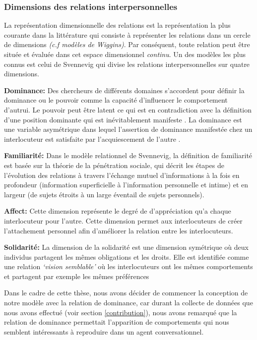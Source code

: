\documentclass[a4paper,french]{article}
\begin{document}
\subsubsection{Dimensions des relations interpersonnelles}
La représentation dimensionnelle des relations est la représentation la plus courante dans la littérature qui consiste à représenter les relations dans un cercle de dimensions \emph{(c.f modèles de Wiggins)}. Par conséquent, toute relation peut être située et évaluée dans cet espace dimensionnel \textit{continu}. Un des modèles les plus connus est celui de Svennevig \cite{svennevig2000getting} qui divise les relations interpersonnelles sur quatre dimensions. 
\par \textbf{Dominance:} Des chercheurs de différents domaines s'accordent pour définir la dominance ou le pouvoir comme la capacité d'influencer le comportement d'autrui. Le pouvoir peut être latent \cite{komter1989hidden} ce qui est en contradiction avec la définition d'une position dominante qui est inévitablement manifeste \cite{dunbar2005perceptions}. La dominance est une variable asymétrique dans lequel l'assertion de dominance manifestée chez un interlocuteur est satisfaite par l'acquiescement de l'autre \cite{rogers1979domineeringness}.

\par \textbf{Familiarité:} Dans le modèle relationnel de Svennevig, la définition de familiarité est basée sur la théorie de la pénétration sociale, qui décrit les étapes de l'évolution des relations à travers l'échange mutuel d'informations à la fois en profondeur (information superficielle à l'information personnelle et intime) et en largeur (de sujets étroits à un large éventail de sujets personnels).

\par \textbf{Affect:} Cette dimension représente le degré de d'appréciation qu'a chaque interlocuteur pour l'autre. Cette dimension permet aux interlocuteurs de créer l'attachement personnel afin d'améliorer la relation entre les interlocuteurs\cite{nicholson2001role}.
	
\par \textbf{Solidarité:} La dimension de la solidarité est une dimension symétrique où deux individus partagent les mêmes obligations et les droits. Elle est identifiée comme une  relation  \emph{‘vision semblable’} où les interlocuteurs ont les mêmes comportements et partagent par exemple les mêmes préférences

\par Dans le cadre de cette thèse, nous avons décider de commencer la conception de notre modèle avec la relation de dominance, car durant la collecte de données que nous avons effectué (voir section \ref{contribution}), nous avons remarqué que la relation de dominance permettait l'apparition de comportements qui nous semblent intéressants à reproduire dans un agent conversationnel.  
\end{document}
